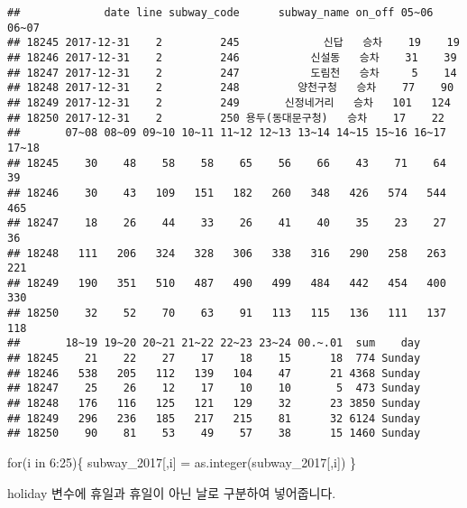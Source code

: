 \documentclass[]{article}
\begin{document}
\begin{verbatim}
##             date line subway_code      subway_name on_off 05~06 06~07
## 18245 2017-12-31    2         245             신답   승차    19    19
## 18246 2017-12-31    2         246           신설동   승차    31    39
## 18247 2017-12-31    2         247           도림천   승차     5    14
## 18248 2017-12-31    2         248         양천구청   승차    77    90
## 18249 2017-12-31    2         249       신정네거리   승차   101   124
## 18250 2017-12-31    2         250 용두(동대문구청)   승차    17    22
##       07~08 08~09 09~10 10~11 11~12 12~13 13~14 14~15 15~16 16~17 17~18
## 18245    30    48    58    58    65    56    66    43    71    64    39
## 18246    30    43   109   151   182   260   348   426   574   544   465
## 18247    18    26    44    33    26    41    40    35    23    27    36
## 18248   111   206   324   328   306   338   316   290   258   263   221
## 18249   190   351   510   487   490   499   484   442   454   400   330
## 18250    32    52    70    63    91   113   115   136   111   137   118
##       18~19 19~20 20~21 21~22 22~23 23~24 00.~.01  sum    day
## 18245    21    22    27    17    18    15      18  774 Sunday
## 18246   538   205   112   139   104    47      21 4368 Sunday
## 18247    25    26    12    17    10    10       5  473 Sunday
## 18248   176   116   125   121   129    32      23 3850 Sunday
## 18249   296   236   185   217   215    81      32 6124 Sunday
## 18250    90    81    53    49    57    38      15 1460 Sunday
\end{verbatim}

for(i in 6:25)\{ subway\_2017{[},i{]} = as.integer(subway\_2017{[},i{]})
\}

holiday 변수에 휴일과 휴일이 아닌 날로 구분하여 넣어줍니다.
\end{document}

